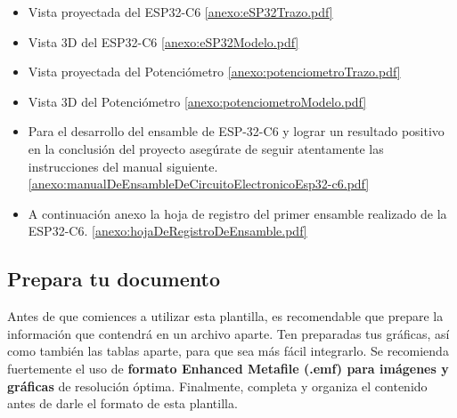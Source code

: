         \begin{itemize}
            \item Vista proyectada del ESP32-C6
            \ref{anexo:eSP32Trazo.pdf}
        \end{itemize}
        \begin{itemize}
            \item Vista 3D del ESP32-C6
            \ref{anexo:eSP32Modelo.pdf}
        \end{itemize}

        \begin{itemize}
            \item Vista proyectada del Potenciómetro
            \ref{anexo:potenciometroTrazo.pdf}
        \end{itemize}
        \begin{itemize}
            \item Vista 3D del Potenciómetro
            \ref{anexo:potenciometroModelo.pdf}
        \end{itemize}


        
        \begin{itemize}
            \item Para el desarrollo del ensamble de ESP-32-C6 y lograr un resultado positivo en la conclusión del proyecto asegúrate de seguir atentamente las instrucciones del manual siguiente.
            \ref{anexo:manualDeEnsambleDeCircuitoElectronicoEsp32-c6.pdf}
        \end{itemize}

        \begin{itemize}
            \item A continuación anexo la hoja de registro del primer ensamble realizado de la ESP32-C6.
            \ref{anexo:hojaDeRegistroDeEnsamble.pdf}
        \end{itemize}


    \subsection{Prepara tu documento}

        Antes de que comiences a utilizar esta plantilla, es recomendable que prepare la información que contendrá en un archivo aparte. 
        Ten preparadas tus gráficas, así como también las tablas aparte, para que sea más fácil integrarlo. 
        Se recomienda fuertemente el uso de \textbf{formato Enhanced Metafile (.emf) para imágenes y gráficas} de resolución óptima. 
        Finalmente, completa y organiza el contenido antes de darle el formato de esta plantilla. 


